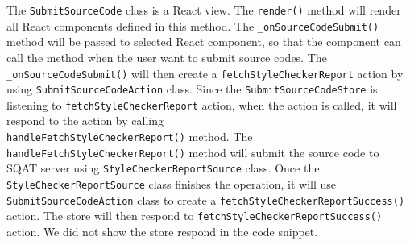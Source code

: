 The \verb|SubmitSourceCode| class is a React view. The \verb|render()| method will render all React components defined in this method. The \verb|_onSourceCodeSubmit()| method will be passed to selected React component, so that the component can call the method when the user want to submit source codes. The \verb|_onSourceCodeSubmit()| will then create a \verb|fetchStyleCheckerReport| action by using \verb|SubmitSourceCodeAction| class. Since the \verb|SubmitSourceCodeStore| is listening to \verb|fetchStyleCheckerReport| action, when the action is called, it will respond to the action by calling\\ \verb|handleFetchStyleCheckerReport()| method. The \verb|handleFetchStyleCheckerReport()| method will submit the source code to SQAT server using \verb|StyleCheckerReportSource| class. Once the \verb|StyleCheckerReportSource| class finishes the operation, it will use \verb|SubmitSourceCodeAction| class to create a \verb|fetchStyleCheckerReportSuccess()| action. The store will then respond to \verb|fetchStyleCheckerReportSuccess()| action. We did not show the store respond in the code snippet.




